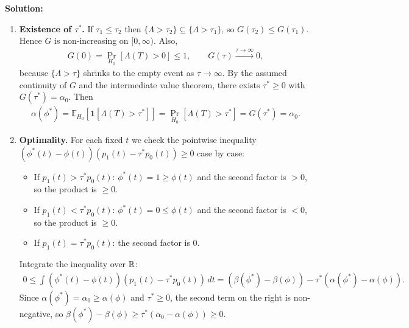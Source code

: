 \documentclass[12pt]{article}
\renewcommand{\fE}{\mathbb{E}}
\begin{document}
\begin{enumerate}
\begin{solution}
{\bf Solution:}\\
\begin{enumerate}
    \item \textbf{Existence of $\tau^*$.} If $\tau_1 \le \tau_2$ then $\{\Lambda > \tau_2\} \subseteq \{\Lambda > \tau_1\}$, so $G(\tau_2) \le G(\tau_1)$. Hence $G$ is non-increasing on $[0, \infty)$. Also,
    \begin{align*}
        G(0) = \Pr_{H_0}[\Lambda(T) > 0] \le 1, \qquad G(\tau) \xrightarrow{\tau \to \infty} 0,
    \end{align*}
    because $\{\Lambda > \tau\}$ shrinks to the empty event as $\tau \to \infty$. By the assumed continuity of $G$ and the intermediate value theorem, there exists $\tau^* \ge 0$ with $G(\tau^*) = \alpha_0$. Then
    \begin{align*}
        \alpha(\phi^*) = \fE_{H_0}[\mathbf{1}[\Lambda(T) > \tau^*]] = \Pr_{H_0}[\Lambda(T) > \tau^*] = G(\tau^*) = \alpha_0.
    \end{align*}

    \item \textbf{Optimality.} For each fixed $t$ we check the pointwise inequality $(\phi^*(t) - \phi(t))(p_1(t) - \tau^* p_0(t)) \ge 0$ case by case:
    \begin{itemize}
        \item If $p_1(t) > \tau^* p_0(t)$: $\phi^*(t) = 1 \ge \phi(t)$ and the second factor is $> 0$, so the product is $\ge 0$.
        \item If $p_1(t) < \tau^* p_0(t)$: $\phi^*(t) = 0 \le \phi(t)$ and the second factor is $< 0$, so the product is $\ge 0$.
        \item If $p_1(t) = \tau^* p_0(t)$: the second factor is $0$.
    \end{itemize}
    Integrate the inequality over $\mathbb{R}$:
    \begin{align*}
        0 \le \int (\phi^*(t) - \phi(t))(p_1(t) - \tau^* p_0(t))\, dt = (\beta(\phi^*) - \beta(\phi)) - \tau^*(\alpha(\phi^*) - \alpha(\phi)).
    \end{align*}
    Since $\alpha(\phi^*) = \alpha_0 \ge \alpha(\phi)$ and $\tau^* \ge 0$, the second term on the right is non-negative, so $\beta(\phi^*) - \beta(\phi) \ge \tau^*(\alpha_0 - \alpha(\phi)) \ge 0$.


\end{enumerate}
\end{solution}
\end{enumerate}
\end{document}
